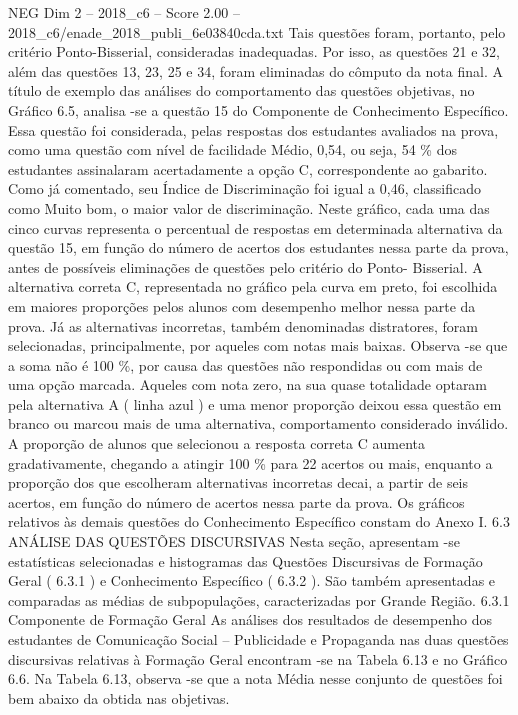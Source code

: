 \begin{textsample}{NEG Dim 2 – 2018\_c6 – Score 2.00 – 2018\_c6/enade\_2018\_publi\_6e03840cda.txt}
Tais questões foram, portanto, pelo critério Ponto-Bisserial, consideradas inadequadas.
Por isso, as questões 21 e 32, além das questões 13, 23, 25 e 34, foram eliminadas do cômputo da nota final.
A título de exemplo das análises do comportamento das questões objetivas, no Gráfico 6.5, analisa -se a questão 15 do Componente de Conhecimento Específico.
Essa questão foi considerada, pelas respostas dos estudantes avaliados na prova, como uma questão com nível de facilidade Médio, 0,54, ou seja, 54 \% dos estudantes assinalaram acertadamente a opção C, correspondente ao gabarito.
Como já comentado, seu Índice de Discriminação foi igual a 0,46, classificado como Muito bom, o maior valor de discriminação.
Neste gráfico, cada uma das cinco curvas representa o percentual de respostas em determinada alternativa da questão 15, em função do número de acertos dos estudantes nessa parte da prova, antes de possíveis eliminações de questões pelo critério do Ponto- Bisserial.
A alternativa correta C, representada no gráfico pela curva em preto, foi escolhida em maiores proporções pelos alunos com desempenho melhor nessa parte da prova.
Já as alternativas incorretas, também denominadas distratores, foram selecionadas, principalmente, por aqueles com notas mais baixas.
Observa -se que a soma não é 100 \%, por causa das questões não respondidas ou com mais de uma opção marcada.
Aqueles com nota zero, na sua quase totalidade optaram pela alternativa A ( linha azul ) e uma menor proporção deixou essa questão em branco ou marcou mais de uma alternativa, comportamento considerado inválido.
A proporção de alunos que selecionou a resposta correta C aumenta gradativamente, chegando a atingir 100 \% para 22 acertos ou mais, enquanto a proporção dos que escolheram alternativas incorretas decai, a partir de seis acertos, em função do número de acertos nessa parte da prova.
Os gráficos relativos às demais questões do Conhecimento Específico constam do Anexo I. 6.3 ANÁLISE DAS QUESTÕES DISCURSIVAS Nesta seção, apresentam -se estatísticas selecionadas e histogramas das Questões Discursivas de Formação Geral ( 6.3.1 ) e Conhecimento Específico ( 6.3.2 ).
São também apresentadas e comparadas as médias de subpopulações, caracterizadas por Grande Região. 6.3.1 Componente de Formação Geral As análises dos resultados de desempenho dos estudantes de Comunicação Social – Publicidade e Propaganda nas duas questões discursivas relativas à Formação Geral encontram -se na Tabela 6.13 e no Gráfico 6.6.
Na Tabela 6.13, observa -se que a nota Média nesse conjunto de questões foi bem abaixo da obtida nas objetivas.

\end{textsample}

